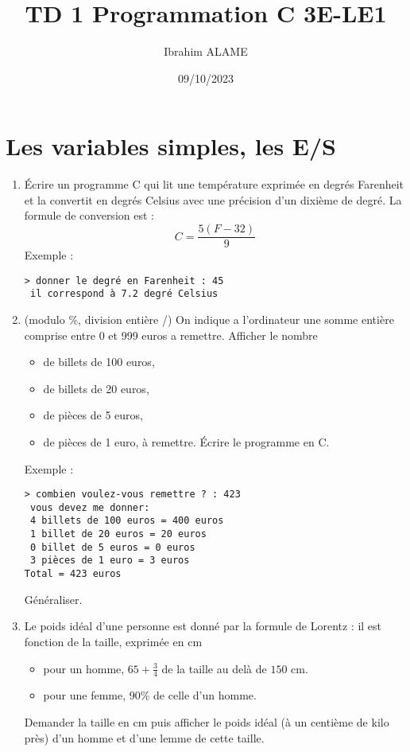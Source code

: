 \documentclass[a4paper]{article}
\title{TD 1  Programmation C 3E-LE1}
\author{Ibrahim ALAME}
\date{09/10/2023}
\begin{document}
\maketitle
\section{Les variables simples, les E/S}
\begin{enumerate}
\item Écrire un programme C qui lit une température exprimée en degrés Farenheit et la convertit en degrés Celsius avec une précision d'un dixième de degré. La formule de conversion est :
\[ C=\frac{5(F-32)}9\]
Exemple :
\begin{verbatim}
> donner le degré en Farenheit : 45
 il correspond à 7.2 degré Celsius
\end{verbatim}
\item (modulo \%, division entière /)
On indique a l'ordinateur une somme entière comprise entre 0 et 999 euros a remettre. Afficher le nombre
\begin{itemize}
\item de billets de 100 euros,
\item de billets de 20 euros,
\item de pièces de 5 euros,
\item de pièces de 1 euro,
à remettre. Écrire le programme en C.
\end{itemize}
Exemple :
\begin{verbatim}
> combien voulez-vous remettre ? : 423
 vous devez me donner:
 4 billets de 100 euros = 400 euros
 1 billet de 20 euros = 20 euros
 0 billet de 5 euros = 0 euros
 3 pièces de 1 euro = 3 euros
Total = 423 euros
\end{verbatim}
Généraliser.

\item Le poids idéal d'une personne est donné par la formule de Lorentz : il est fonction de la taille, exprimée en cm

\begin{itemize}
\item pour un homme, $65 + \frac 34$ de la taille au delà de $150$ cm.
\item pour une femme, $90\%$ de celle d'un homme.
\end{itemize}
Demander la taille en cm puis afficher le poids idéal (à un centième de kilo près) d'un homme et d'une lemme de cette taille.


\end{enumerate}
\end{document}
